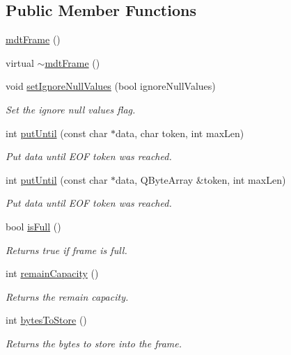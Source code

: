 \subsection*{Public Member Functions}
\begin{DoxyCompactItemize}
\item 
\hyperlink{classmdt_frame_a5601584ff7b3fdd26ff8d10f3f290982}{mdt\-Frame} ()
\item 
virtual \hyperlink{classmdt_frame_ad0deea44f86ffd2f7914e64346d2ab8e}{$\sim$mdt\-Frame} ()
\item 
void \hyperlink{classmdt_frame_ac1a8ad77ce7bd6d08032056c3610d5c0}{set\-Ignore\-Null\-Values} (bool ignore\-Null\-Values)
\begin{DoxyCompactList}\small\item\em Set the ignore null values flag. \end{DoxyCompactList}\item 
int \hyperlink{classmdt_frame_af03d60dadc6bd33b3a333cf484463113}{put\-Until} (const char $\ast$data, char token, int max\-Len)
\begin{DoxyCompactList}\small\item\em Put data until E\-O\-F token was reached. \end{DoxyCompactList}\item 
int \hyperlink{classmdt_frame_aaa5c15df5aaf026b02f34639438036ad}{put\-Until} (const char $\ast$data, Q\-Byte\-Array \&token, int max\-Len)
\begin{DoxyCompactList}\small\item\em Put data until E\-O\-F token was reached. \end{DoxyCompactList}\item 
bool \hyperlink{classmdt_frame_ab4e0fee7198c94c16f2fa6eb4b6b1562}{is\-Full} ()
\begin{DoxyCompactList}\small\item\em Returns true if frame is full. \end{DoxyCompactList}\item 
int \hyperlink{classmdt_frame_aa1cd5c914c36efb3f441b7f6e782dc24}{remain\-Capacity} ()
\begin{DoxyCompactList}\small\item\em Returns the remain capacity. \end{DoxyCompactList}\item 
int \hyperlink{classmdt_frame_a8526b227a56562fddf8445060e8095d4}{bytes\-To\-Store} ()
\begin{DoxyCompactList}\small\item\em Returns the bytes to store into the frame. \end{DoxyCompactList}\item 

\end{DoxyCompactItemize}
